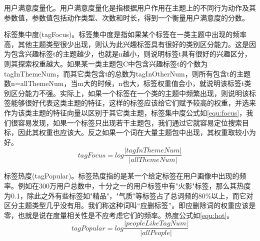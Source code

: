   用户满意度量化。用户满意度量化是指根据用户作用在主题上的不同行为动作及其参数值，参数值包括动作类型、次数和时长，得到一个衡量用户满意度的分数。

  标签集中度(tagFocus)。标签集中度是指如果某个标签在一类主题中出现的频率高，其他主题类型很少出现，则认为此兴趣标签具有很好的类别区分能力。这是因为包含兴趣标签t的主题越少，也就是n越小，则说明标签t具有很好的兴趣区分，则其探索权重越大。如果某一类主题包C中包含兴趣标签t的个数为tagInThemeNum，而其它类包含t的总数为tagInOtherNum，则所有包含t的主题数n=allThemeNum，当m大的时候，n也大，标签权重值会小，就说明该标签t类别区分能力不强。实际上，如果一个标签在一个类的主题中频繁出现，则说明该标签能够很好代表这类主题的特征，这样的标签应该给它们赋予较高的权重，并选来作为该类主题的特征向量以区别于其它类主题，标签集中度公式如\autoref{equ:focus}，我们很容易发现，如果一个标签只出现若干主题包，我们通过它就容易定位搜索目标，因此其权重也应该大。反之如果一个词在大量主题包中出现，其权重取较小为好。
  \begin{equation}
    tagFocus=log\frac{|tagInThemeNum|}{|allThemeNum|}
    \label{equ:focus}
  \end{equation}


  标签热度(tagPopular)。标签热度指的是某一个给定标签在用户画像中出现的频率。例如在300万用户总数中，十分之一的用户标签中有"火影"标签，那么其热度为0.1，除此之外有些标签如"精品"，"气质"等标签占了总词频的80\%以上，而它对区分主题类型几乎没有用。我们称这种词叫“应删标签”。即应删除词的权重应该是零，也就是说在度量相关性是不应考虑它们的频率。热度公式如\autoref{equ:hot}。
  \begin{equation}
    tagPopular=log\frac{|peopleLikeTagNum|}{|allPeople|}
    \label{equ:hot}
  \end{equation}

